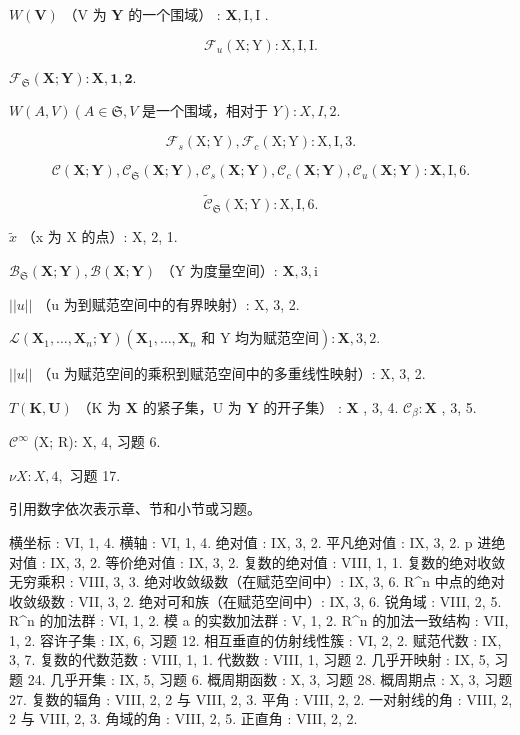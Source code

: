 \(W(\mathbf{V})\) （V 为 \(\mathbf{Y}\) 的一个围域） : \(\mathbf{X}, \mathrm{I}, \mathrm{I}\) .

\[
\mathcal {F} _ {u} (\mathrm{X}; \mathrm{Y}): \mathrm{X}, \mathrm{I}, \mathrm{I}.
\]

\(\mathcal{F}_{\mathfrak{S}}(\mathbf{X};\mathbf{Y}):\mathbf{X},\mathbf{1},\mathbf{2}.\)

\(W(A, V) (A \in \mathfrak{S}, V \text{ 是一个围域，相对于 } Y): X, I, 2.\)

\[
\mathcal {F} _ {s} (\mathrm{X}; \mathrm{Y}), \mathcal {F} _ {c} (\mathrm{X}; \mathrm{Y}): \mathrm{X}, \mathrm{I}, 3.
\]

\[
\mathcal {C} (\mathbf {X}; \mathbf {Y}), \mathcal {C} _ {\mathfrak {S}} (\mathbf {X}; \mathbf {Y}), \mathcal {C} _ {s} (\mathbf {X}; \mathbf {Y}), \mathcal {C} _ {c} (\mathbf {X}; \mathbf {Y}), \mathcal {C} _ {u} (\mathbf {X}; \mathbf {Y}): \mathbf {X}, \mathrm{I}, 6.
\]

\[
\tilde {\mathcal {C}} _ {\mathfrak {S}} (\mathrm{X}; \mathrm{Y}): \mathrm{X}, \mathrm{I}, 6.
\]

\(\tilde{x}\) （x 为 X 的点）: X, 2, 1.

\(\mathcal{B}_{\mathfrak{S}}(\mathbf{X};\mathbf{Y}),\mathcal{B}(\mathbf{X};\mathbf{Y})\) （Y 为度量空间）: \(\mathbf{X},3,\mathrm{i}\)

\(||u||\) （u 为到赋范空间中的有界映射）: X, 3, 2.

\(\mathscr{L}\left(\mathbf{X}_{1},\ldots,\mathbf{X}_{n};\mathbf{Y}\right)\left(\mathbf{X}_{1},\ldots,\mathbf{X}_{n}\text{ 和 Y 均为赋范空间}\right):\mathbf{X},3,2.\)

\(||u||\) （u 为赋范空间的乘积到赋范空间中的多重线性映射）: X, 3, 2.

\(T(\mathbf{K},\mathbf{U})\) （K 为 \(\mathbf{X}\) 的紧子集，U 为 \(\mathbf{Y}\) 的开子集） : \(\mathbf{X}\) , 3, 4. \(\mathcal{C}_{\beta}:\mathbf{X}\) , 3, 5.

\(\mathcal{C}^{\infty}\) (X; R): X, 4, 习题 6.

\(\nu X:X,4,\) 习题 17.

引用数字依次表示章、节和小节或习题。

横坐标 : VI, 1, 4. 横轴 : VI, 1, 4. 绝对值 : IX, 3, 2. 平凡绝对值 : IX, 3, 2. p 进绝对值 : IX, 3, 2. 等价绝对值 : IX, 3, 2. 复数的绝对值 : VIII, 1, 1. 复数的绝对收敛无穷乘积 : VIII, 3, 3. 绝对收敛级数（在赋范空间中）: IX, 3, 6. R\^{}n 中点的绝对收敛级数 : VII, 3, 2. 绝对可和族（在赋范空间中）: IX, 3, 6. 锐角域 : VIII, 2, 5. R\^{}n 的加法群 : VI, 1, 2. 模 a 的实数加法群 : V, 1, 2. R\^{}n 的加法一致结构 : VII, 1, 2. 容许子集 : IX, 6, 习题 12. 相互垂直的仿射线性簇 : VI, 2, 2. 赋范代数 : IX, 3, 7. 复数的代数范数 : VIII, 1, 1. 代数数 : VIII, 1, 习题 2. 几乎开映射 : IX, 5, 习题 24. 几乎开集 : IX, 5, 习题 6. 概周期函数 : X, 3, 习题 28. 概周期点 : X, 3, 习题 27. 复数的辐角 : VIII, 2, 2 与 VIII, 2, 3. 平角 : VIII, 2, 2. 一对射线的角 : VIII, 2, 2 与 VIII, 2, 3. 角域的角 : VIII, 2, 5. 正直角 : VIII, 2, 2.

